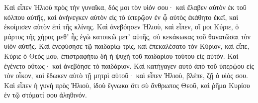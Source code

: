 {\par }{\PP {}Καὶ εἶπεν Ἠλιοὺ πρὸς τὴν γυναῖκα, δός μοι τὸν υἱόν σου· καὶ ἔλαβεν αὐτὸν ἐκ τοῦ κόλπου αὐτῆς, καὶ ἀνήνεγκεν αὐτὸν εἰς τὸ ὑπερῷον ἐν ᾧ αὐτὸς ἐκάθητο ἐκεῖ, καὶ ἐκοίμισεν αὐτὸν ἐπὶ τῆς κλίνης.
Καὶ ἀνεβόησεν Ἠλιοὺ, καὶ εἶπεν, οἵ μοι Κύριε, ὁ μάρτυς τῆς χήρας μεθʼ ἧς ἐγὼ κατοικῶ μετʼ αὐτῆς, σὺ κεκάκωκας τοῦ θανατῶσαι τὸν υἱὸν αὐτῆς.
Καὶ ἐνεφύσησε τῷ παιδαρίῳ τρὶς, καὶ ἐπεκαλέσατο τὸν Κύριον, καὶ εἶπε, Κύριε ὁ Θεός μου, ἐπιστραφήτω δὴ ἡ ψυχὴ τοῦ παιδαρίου τούτου εἰς αὐτόν.
Καὶ ἐγένετο οὕτως· καὶ ἀνεβόησε τὸ παιδάριον.
Καὶ κατήγαγεν αυτὸ ἀπὸ τοῦ ὑπερῴου εἰς τὸν οἶκον, καὶ ἔδωκεν αὐτὸ τῇ μητρὶ αὐτοῦ· καὶ εἶπεν Ἠλιοὺ, βλέπε, ζῇ ὁ υἱός σου.
Καὶ εἶπεν ἡ γυνὴ πρὸς Ἠλιοὺ, ἰδοὺ ἔγνωκα ὅτι σὺ ἄνθρωπος Θεοῦ, καὶ ῥῆμα Κυρίου ἐν τῷ στόματί σου ἀληθινόν.

}
